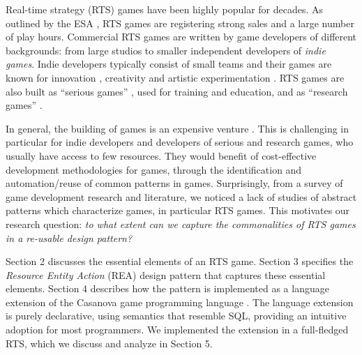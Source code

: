 Real-time strategy (RTS) games have been highly popular for decades. As outlined by the ESA \cite{ESAreport}, RTS games are registering strong sales and a large number of play hours. Commercial RTS games are written by game developers of different backgrounds: from large studios to smaller independent developers of \textit{indie games}. Indie developers \citep{IndiGame} typically consist of small teams and their games are known for innovation \citep{INDIEinnovation}, creativity \citep{INDIEcreativity} and artistic experimentation \citep{INDIEexperimentation}. RTS games are also built as ``serious games'' \citep{SeriousRTS}, used for training and education, and as ``research games'' \citep{ResearchRTS}.

In general, the building of games is an expensive venture \citep{CostsRTS}. This is challenging in particular for indie developers and developers of serious and research games, who usually have access to few resources. They would benefit of cost-effective development methodologies for games, through the identification and automation/reuse of common patterns in games. Surprisingly, from a survey of game development research and literature, we noticed a lack of studies of abstract patterns which characterize games, in particular RTS games. This motivates our research question: \textit{to what extent can we capture the commonalities of RTS games in a re-usable design pattern?}

Section 2 discusses the essential elements of an RTS game. Section 3 specifies the \emph{Resource Entity Action} (REA) design pattern  \cite{designpatterns} that captures these essential elements. Section 4 describes how the pattern is implemented as a language extension of the Casanova game programming language \citep{Casanova}. The language extension is purely declarative, using semantics that resemble SQL, providing an intuitive adoption for most programmers. We implemented the extension in a full-fledged RTS, which we discuss and analyze in Section 5. %


